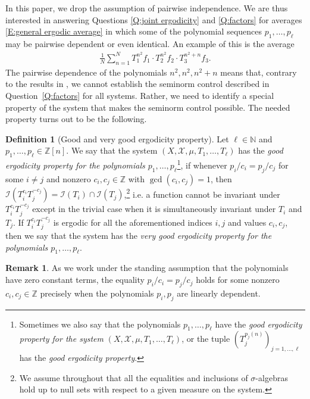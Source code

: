 \documentclass[11pt]{amsart}
\theoremstyle{definition}
\newtheorem*{definition}{Definition}
\newtheorem*{remark}{Remark}
\newcommand{\N}{{\mathbb N}}
\newcommand{\Z}{{\mathbb Z}}
\newcommand{\CI}{{\mathcal I}}
\newcommand{\CX}{{\mathcal X}}
\begin{document}
In this paper, we drop the assumption of pairwise independence. We are thus interested in answering Questions \ref{Q:joint ergodicity} and \ref{Q:factors} for averages \eqref{E:general ergodic average} in which some of the polynomial sequences $p_1, \ldots, p_\ell$ may be pairwise dependent or even identical. An example of this is the average
\begin{align}\label{E:123ex}
    \frac{1}{N}\sum_{n=1}^N T_1^{n^2}f_1 \cdot T_2^{n^2}f_2 \cdot T_3^{n^2+n} f_3.
\end{align}
The pairwise dependence of the polynomials $n^2, n^2, n^2+n$ means that, contrary to the results in \cite{FrKu22}, we cannot establish the seminorm control described in Question~\ref{Q:factors} %
 for all systems. Rather, we need to identify a special property of the system that makes the seminorm control possible.   The needed property turns out to be the following.
\begin{definition}[Good and very good ergodicity property]
	Let $\ell\in\N$ and $p_1,\ldots, p_\ell\in \Z[n]$. We say that the system $(X,\CX,\mu,T_1,\ldots, T_\ell)$ has the \emph{good ergodicity property for the polynomials $p_1,\ldots, p_\ell$}\footnote{Sometimes we also say that  the polynomials $p_1,\ldots, p_\ell$ have  the {\em good ergodicity property for the system} $(X,\CX,\mu,T_1,\ldots, T_\ell)$, or the tuple $(T_j^{p_j(n)})_{j=1,\ldots, \ell}$ has the {\em good ergodicity property}.},  if whenever
	$p_i/c_i=p_j/c_j$ for some $i\neq j$ and nonzero $c_i,c_j\in\Z$ with $\gcd(c_i,c_j)=1$, then
	$
	\CI(T_i^{c_i}T_j^{-c_j}) = \CI(T_i)\cap \CI(T_j)$,\footnote{We assume throughout that all the equalities and inclusions of $\sigma$-algebras hold up to null sets with respect to a given measure on the system.}
	 i.e. a function cannot be invariant under $T_i^{c_i}T_j^{-c_j}$ except in the trivial case when it is simultaneously invariant under $T_i$ and $T_j$. If  $T_i^{c_i}T_j^{-c_j}$ is ergodic for all the aforementioned indices $i,j$ and values $c_i, c_j$, then we say that the system has the \emph{very good ergodicity property for the polynomials $p_1,\ldots, p_\ell$}.
\end{definition}
\begin{remark}
  As we work under the standing assumption that the polynomials have zero constant terms, the equality $p_i/c_i=p_j/c_j$ holds for some nonzero $c_i, c_j\in\Z$ precisely when the polynomials $p_i, p_j$ are linearly dependent.
\end{remark}
\end{document}
